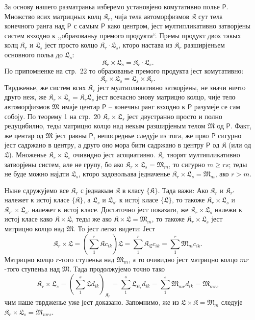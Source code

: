 \documentclass[11pt]{article}
\begin{document}
За основу нашего разматраньа изберемо установјено комутативно полье \(\mathsf P\). Множство всих матрицных колц \(\mathfrak K_r\), чија тела автоморфизмов \(\mathfrak K\) сут тела конечного ранга над \(\mathsf P\) с самым \(\mathsf P\) како центром, јест мултипликативно затворјены систем взходно к ,,образованьу премого продукта``. Премы продукт двох такых колц \(\mathfrak K_r\) и \(\mathfrak L_s\) јест просто колцо \(\mathfrak K_r\cdot\mathfrak L_s\), кторо настава из \(\mathfrak K_r\) разширјеньем основного польа до \(\mathfrak L_s\):
\[
\mathfrak K_r\times\mathfrak L_s=\mathfrak K_r\cdot\mathfrak L_s.
\]
По припомненке на стр.~22 то образованье премого продукта јест комутативно:
\[
\mathfrak K_r\times\mathfrak L_s=\mathfrak L_s\times\mathfrak K_r.
\]
Тврдженье, же систем всих \(\mathfrak K_r\) јест мултипликативно затворјены, не значи ничто друго неж, же \(\mathfrak K_r\times\mathfrak L_s=\mathfrak K_r\mathfrak L_s\) јест всечасно знову матрицно колцо, чије тело автоморфизмов \(\mathfrak M\) имаје центар \(\mathsf P\) -- конечны ранг взходно к \(\mathsf P\) разумеје се сам собоју. По теорему 1 на стр.~20 \(\mathfrak K_r\times\mathfrak L_s\) јест двустранно просто и полно редуцибилно, теды матрицно колцо над некым разширјеным телом \(\mathfrak M\) од \(\mathsf P\). Факт, же центар од \(\mathfrak M\) јест равны \(\mathsf P\), непосреднье следује из тога, же прво \(\mathsf P\) сигурно јест садржано в центру, а друго оно мора бити садржано в центру \(\mathsf P\) од \(\mathfrak K\) (или од \(\mathfrak L\)). Множенье \(\mathfrak K_r\times\mathfrak L_s\) очивидно јест асоциативно. \(\mathfrak K_r\) творят мултипликативно затворјены систем, але не групу, бо ако \(\mathfrak K_r\times\mathfrak L_s=\mathfrak M_m\), то сигурно \(m\geq rs\); теды не буде можно најдти \(\mathfrak L_s\), кторо задовольава једначенье \(\mathfrak K_r\times\mathfrak L_s=\mathfrak M_m\), ако \(r>m\).

Ныне сдружујемо все \(\mathfrak K_r\) с једнакым \(\mathfrak K\) в класу \(\{\mathfrak K\}\). Тада важи: Ако \(\mathfrak K_r\) и \(\mathfrak K_{r'}\) належет к истој класе \(\{\mathfrak K\}\), а \(\mathfrak L_s\) и \(\mathfrak L_{s'}\) к истој класе \(\{\mathfrak L\}\), то такоже \(\mathfrak K_r\times\mathfrak L_s\) и \(\mathfrak K_{r'}\times\mathfrak L_{s'}\) належет к истој класе. Достаточно јест показати, же \(\mathfrak K_r\times\mathfrak L_s\) належи к истој класе како \(\mathfrak K\times\mathfrak L\), теды же ако \(\mathfrak K\times\mathfrak L=\mathfrak M_m\), то такоже \(\mathfrak K_r\times\mathfrak L_s\) јест матрицно колцо над \(\mathfrak M\). То јест легко видети: Јест
\[
\mathfrak K_r\times\mathfrak L
=\left(\sum_1^r\mathfrak K c_{ik}\right)\mathfrak L
=\sum_1^r\mathfrak K_{\mathfrak L}c_{ik}
=\sum_1^r\mathfrak M_m c_{ik}.
\]
Матрицно колцо \(r\)-того ступеньа над \(\mathfrak M_m\), а то очивидно јест матрицно колцо \(mr\)-того ступеньа над \(\mathfrak M\). Тада продолжујемо точно тако
\[
\mathfrak K_r\times\mathfrak L_s
=\left(\sum_1^s\mathfrak L d_{ik}\right)_{\mathfrak K_r}
=\sum_1^s\mathfrak L_{\mathfrak K_r}d_{ik}
=\sum_1^s\mathfrak M_{mr}d_{ik}
=\mathfrak M_{mrs}
\]
чим наше тврдженье уже јест доказано. Запомнимо, же из \(\mathfrak L\times\mathfrak K=\mathfrak M_m\) следује \(\mathfrak K_r\times\mathfrak L_s=\mathfrak M_{mrs}\).
\end{document}
